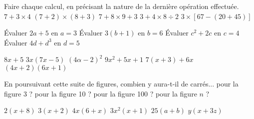 \documentclass[../Cours.tex]{subfiles}
\begin{document}
\clearpage
\EXERCICES
\begin{questions}
        Faire chaque calcul, en précisant la nature de la dernière opération effectuée.
        \question $7 + 3 \times 4$
        \question $(7+2) \times (8+3)$
        \question $7 + 8 \times 9 + 3$
        \question $3 + 4 \times 8 \div 2$
        \question $3 \times \left[ 67 - \left( 20 + 45 \right) \right]$
        
    \vspace{-2em}
    \begin{multicols}{2}
        \question Évaluer $2a+5$ en $a=3$
        \question Évaluer $3(b+1)$ en $b=6$
        \question Évaluer $c^2 + 2c$ en $c=4$
        \question Évaluer $4d+d^3$ en $d=5$
    \end{multicols}

    \vspace{-2em}
    \begin{multicols}{3}
        \question $8x+5$
        \question $3x(7x-5)$
        \question $(4\alpha - 2)^2$
        \question $9x^2+5x+1$
        \question $7(x+3) + 6x$
        \question $(4x+2)(6x+1)$
    \end{multicols}

    \vspace{-2em}
    \begin{center}
    \end{center}

    En poursuivant cette suite de figures, combien y aura-t-il de carrés...
    \question pour la figure 3 ?
    \question pour la figure 10 ?
    \question pour la figure 100 ?
    \question pour la figure $n$ ?

    \vspace{-2em}
    \begin{multicols}{3}
        \question $2(x+8)$
        \question $3(x+2)$
        \question $4x(6+x)$
        \question $3x^2(x+1)$
        \question $25(a+b)$
        \question $y(x+3z)$
    \end{multicols} 


\end{questions}
\end{document}
